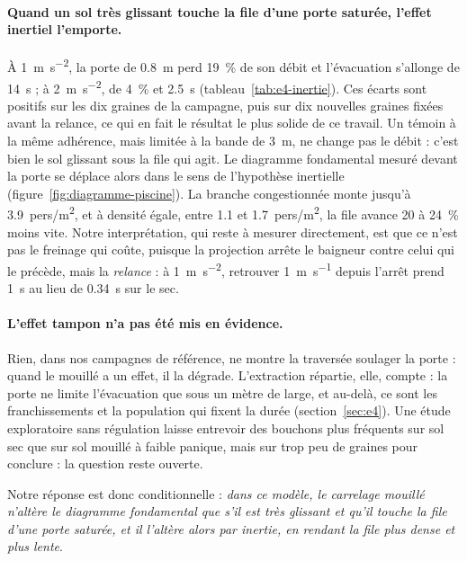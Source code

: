 \paragraph{Quand un sol très glissant touche la file d'une porte saturée, l'effet inertiel
l'emporte.} À \SI{1}{\metre\per\second\squared}, la porte de \SI{0.8}{\metre} perd
\SI{19}{\percent} de son débit et l'évacuation s'allonge de \SI{14}{\second} ; à
\SI{2}{\metre\per\second\squared}, de \SI{4}{\percent} et \SI{2.5}{\second}
(tableau~\ref{tab:e4-inertie}). Ces écarts sont positifs sur les dix graines de la campagne,
puis sur dix nouvelles graines fixées avant la relance, ce qui en fait le résultat le plus
solide de ce travail. Un témoin à la même adhérence, mais limitée à la bande de
\SI{3}{\metre}, ne change pas le débit : c'est bien le sol glissant sous la file qui agit. Le
diagramme fondamental mesuré devant la porte se déplace alors dans le sens de l'hypothèse
inertielle (figure~\ref{fig:diagramme-piscine}). La branche congestionnée monte jusqu'à
\num{3.9}~pers/\si{\metre\squared}, et à densité égale, entre \num{1.1} et
\num{1.7}~pers/\si{\metre\squared}, la file avance 20 à \SI{24}{\percent} moins vite. Notre
interprétation, qui reste à mesurer directement, est que ce n'est pas le freinage qui coûte,
puisque la projection arrête le baigneur contre celui qui le précède, mais la
\emph{relance} : à \SI{1}{\metre\per\second\squared}, retrouver \SI{1}{\metre\per\second}
depuis l'arrêt prend \SI{1}{\second} au lieu de \SI{0.34}{\second} sur le sec.

\paragraph{L'effet tampon n'a pas été mis en évidence.} Rien, dans nos campagnes de
référence, ne montre la traversée soulager la porte : quand le mouillé a un effet, il la
dégrade. L'extraction répartie, elle, compte : la porte ne limite l'évacuation que sous un
mètre de large, et au-delà, ce sont les franchissements et la population qui fixent la durée
(section~\ref{sec:e4}). Une étude exploratoire sans régulation laisse entrevoir des bouchons
plus fréquents sur sol sec que sur sol mouillé à faible panique, mais sur trop peu de graines
pour conclure : la question reste ouverte.

Notre réponse est donc conditionnelle : \emph{dans ce modèle, le carrelage mouillé n'altère
le diagramme fondamental que s'il est très glissant et qu'il touche la file d'une porte
saturée, et il l'altère alors par inertie, en rendant la file plus dense et plus lente}.

